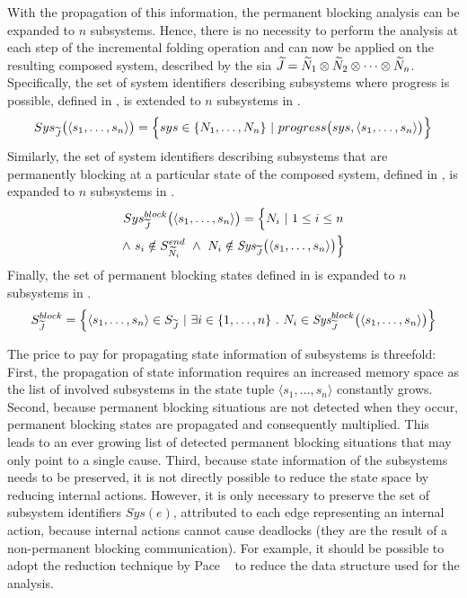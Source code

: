 With the propagation of this information, the permanent blocking analysis can be expanded to $n$ subsystems.
Hence, there is no necessity to perform the analysis at each step of the incremental folding operation and can now be applied on the resulting composed system, described by the \gls{sia} $\widetilde{J} = \widetilde{N}_1 \otimes \widetilde{N}_2 \otimes \dots \otimes \widetilde{N}_n$.
Specifically, the set of system identifiers describing subsystems where progress is possible, defined in \Equ{\ref{eq_sia_sys_alive}}, is extended to $n$ subsystems in \Equ{\ref{eq_sia_sys_aliven}}.
\begin{equation}
    \label{eq_sia_sys_aliven}
    Sys_{\widetilde{\mathit{J}}} \big ( \langle s_1, \dots, s_n \rangle \big ) = \Big \{ sys \in \{ N_1, \dots, N_n \} \ | \ progress \big ( sys, \langle s_1, \dots, s_n \rangle \big ) \Big \}
\end{equation}
Similarly, the set of system identifiers describing subsystems that are permanently blocking at a particular state of the composed system, defined in \Equ{\ref{eq_sia_sys}}, is expanded to $n$ subsystems in \Equ{\ref{eq_sia_sysn}}.
\begin{multline}
    \label{eq_sia_sysn}
    Sys_{\widetilde{\mathit{J}}}^{block}\big ( \langle s_1, \dots, s_n \rangle \big ) = \Big \{ N_i \ | \ 1 \leq i \leq n \\
    \land \ s_i \notin S_{\widetilde{N}_i}^{end} \ \land \  N_i \notin \mathit{Sys}_{\widetilde{\mathit{J}}}\big ( \langle s_1, \dots, s_n \rangle \big ) \Big \}
\end{multline}
Finally, the set of permanent blocking states defined in \Equ{\ref{eq_sia_block}} is expanded to $n$ subsystems in \Equ{\ref{eq_sia_blockn}}.
\begin{equation}
    \label{eq_sia_blockn}
    S_{\widetilde{\mathit{J}}}^{block} = \Big \{ \langle s_1, \dots, s_n \rangle \in S_{\widetilde{\mathit{J}}} \ | \ \exists i \in \{ 1, \dots, n \} \ . \  N_i \in \mathit{Sys}_{\widetilde{\mathit{J}}}^{block} \big ( \langle s_1, \dots, s_n \rangle \big ) \Big \}
\end{equation}

The price to pay for propagating state information of subsystems is threefold:
First, the propagation of state information requires an increased memory space as the list of involved subsystems in the state tuple $\langle s_1, \dots, s_n \rangle$ constantly grows.
Second, because permanent blocking situations are not detected when they occur, permanent blocking states are propagated and consequently multiplied.
This leads to an ever growing list of detected permanent blocking situations that may only point to a single cause.
Third, because state information of the subsystems needs to be preserved, it is not directly possible to reduce the state space by reducing internal actions.
However, it is only necessary to preserve the set of subsystem identifiers $\mathit{Sys}(e)$, attributed to each edge representing an internal action, because internal actions cannot cause deadlocks (they are the result of a non-permanent blocking communication).
For example, it should be possible to adopt the reduction technique by Pace \etal~\cite{pace2003} to reduce the data structure used for the analysis.

